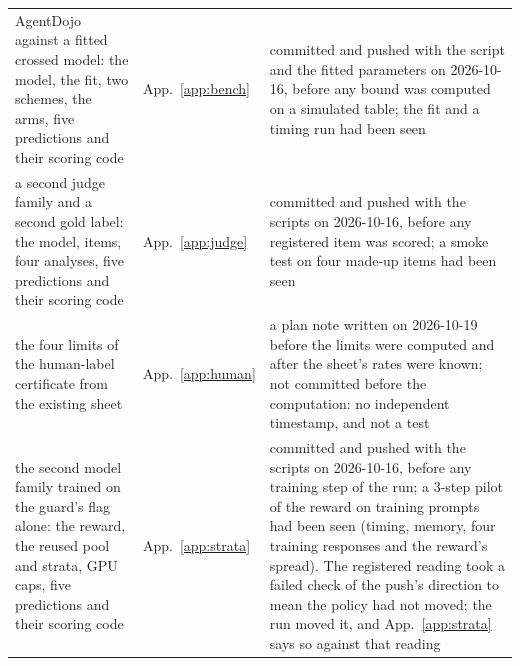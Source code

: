 \begin{tabular}{@{}p{5.6cm} l p{9.2cm}@{}}
AgentDojo against a fitted crossed model: the model, the fit, two schemes, the arms, five predictions and their scoring code & App.~\ref{app:bench} & committed and pushed with the script and the fitted parameters on 2026-10-16, before any bound was computed on a simulated table; the fit and a timing run had been seen \\
a second judge family and a second gold label: the model, items, four analyses, five predictions and their scoring code & App.~\ref{app:judge} & committed and pushed with the scripts on 2026-10-16, before any registered item was scored; a smoke test on four made-up items had been seen \\
the four limits of the human-label certificate from the existing sheet & App.~\ref{app:human} & a plan note written on 2026-10-19 before the limits were computed and after the sheet's rates were known; not committed before the computation: no independent timestamp, and not a test \\
the second model family trained on the guard's flag alone: the reward, the reused pool and strata, GPU caps, five predictions and their scoring code & App.~\ref{app:strata} & committed and pushed with the scripts on 2026-10-16, before any training step of the run; a 3-step pilot of the reward on training prompts had been seen (timing, memory, four training responses and the reward's spread). The registered reading took a failed check of the push's direction to mean the policy had not moved; the run moved it, and App.~\ref{app:strata} says so against that reading \\
\bottomrule
\end{tabular}

